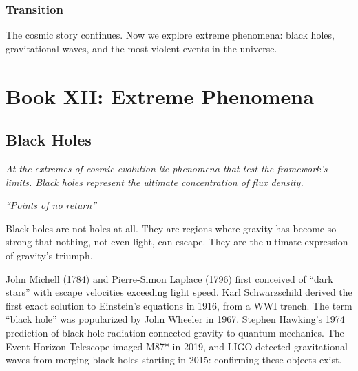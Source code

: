 \documentclass[
  11pt,
  letterpaper,
  twoside,
  openright]{book}
\begin{document}
\section{Transition}\label{transition-32}

The cosmic story continues. Now we explore extreme phenomena: black
holes, gravitational waves, and the most violent events in the universe.

\part{Book XII: Extreme Phenomena}

\chapter{Black Holes}\label{sec-black-holes}

\emph{At the extremes of cosmic evolution lie phenomena that test the
framework's limits. Black holes represent the ultimate concentration of
flux density.}

\emph{``Points of no return''}

\begin{tcolorbox}[enhanced jigsaw, coltitle=black, colbacktitle=quarto-callout-note-color!10!white, toprule=.15mm, colframe=quarto-callout-note-color-frame, arc=.35mm, opacityback=0, bottomtitle=1mm, toptitle=1mm, breakable, colback=white, titlerule=0mm, opacitybacktitle=0.6, title=\textcolor{quarto-callout-note-color}{\faInfo}\hspace{0.5em}{Key Revelation}, rightrule=.15mm, bottomrule=.15mm, leftrule=.75mm, left=2mm]

Black holes are not holes at all. They are regions where gravity has
become so strong that nothing, not even light, can escape. They are the
ultimate expression of gravity's triumph.

\end{tcolorbox}

\begin{tcolorbox}[enhanced jigsaw, coltitle=black, colbacktitle=quarto-callout-note-color!10!white, toprule=.15mm, colframe=quarto-callout-note-color-frame, arc=.35mm, opacityback=0, bottomtitle=1mm, toptitle=1mm, breakable, colback=white, titlerule=0mm, opacitybacktitle=0.6, title=\textcolor{quarto-callout-note-color}{\faInfo}\hspace{0.5em}{Historical Context}, rightrule=.15mm, bottomrule=.15mm, leftrule=.75mm, left=2mm]

John Michell (1784) and Pierre-Simon Laplace (1796) first conceived of
``dark stars'' with escape velocities exceeding light speed. Karl
Schwarzschild derived the first exact solution to Einstein's equations
in 1916, from a WWI trench. The term ``black hole'' was popularized by
John Wheeler in 1967. Stephen Hawking's 1974 prediction of black hole
radiation connected gravity to quantum mechanics. The Event Horizon
Telescope imaged M87* in 2019, and LIGO detected gravitational waves
from merging black holes starting in 2015: confirming these objects
exist.

\end{tcolorbox}
\end{document}
